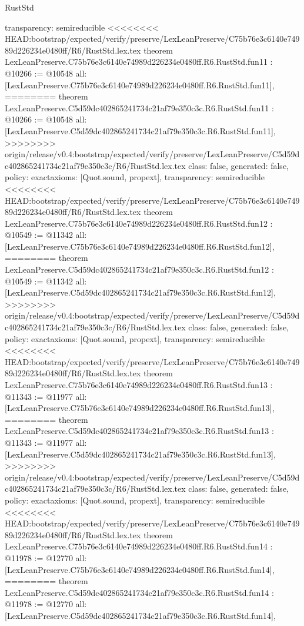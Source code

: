 \begin{lexlean}{RustStd}
\begin{coremodule}
{\begin{coremodule}
{{{{{{{{{{{{{{  transparency: semireducible
}
<<<<<<<< HEAD:bootstrap/expected/verify/preserve/LexLeanPreserve/C75b76e3c6140e74989d226234e0480ff/R6/RustStd.lex.tex
theorem LexLeanPreserve.C75b76e3c6140e74989d226234e0480ff.R6.RustStd.fun11 : @10266 := @10548 {
  all: [LexLeanPreserve.C75b76e3c6140e74989d226234e0480ff.R6.RustStd.fun11],
========
theorem LexLeanPreserve.C5d59dc402865241734c21af79e350c3c.R6.RustStd.fun11 : @10266 := @10548 {
  all: [LexLeanPreserve.C5d59dc402865241734c21af79e350c3c.R6.RustStd.fun11],
>>>>>>>> origin/release/v0.4:bootstrap/expected/verify/preserve/LexLeanPreserve/C5d59dc402865241734c21af79e350c3c/R6/RustStd.lex.tex
  class: false,
  generated: false,
  policy: exact{axioms: [Quot.sound, propext]},
  transparency: semireducible
}
<<<<<<<< HEAD:bootstrap/expected/verify/preserve/LexLeanPreserve/C75b76e3c6140e74989d226234e0480ff/R6/RustStd.lex.tex
theorem LexLeanPreserve.C75b76e3c6140e74989d226234e0480ff.R6.RustStd.fun12 : @10549 := @11342 {
  all: [LexLeanPreserve.C75b76e3c6140e74989d226234e0480ff.R6.RustStd.fun12],
========
theorem LexLeanPreserve.C5d59dc402865241734c21af79e350c3c.R6.RustStd.fun12 : @10549 := @11342 {
  all: [LexLeanPreserve.C5d59dc402865241734c21af79e350c3c.R6.RustStd.fun12],
>>>>>>>> origin/release/v0.4:bootstrap/expected/verify/preserve/LexLeanPreserve/C5d59dc402865241734c21af79e350c3c/R6/RustStd.lex.tex
  class: false,
  generated: false,
  policy: exact{axioms: [Quot.sound, propext]},
  transparency: semireducible
}
<<<<<<<< HEAD:bootstrap/expected/verify/preserve/LexLeanPreserve/C75b76e3c6140e74989d226234e0480ff/R6/RustStd.lex.tex
theorem LexLeanPreserve.C75b76e3c6140e74989d226234e0480ff.R6.RustStd.fun13 : @11343 := @11977 {
  all: [LexLeanPreserve.C75b76e3c6140e74989d226234e0480ff.R6.RustStd.fun13],
========
theorem LexLeanPreserve.C5d59dc402865241734c21af79e350c3c.R6.RustStd.fun13 : @11343 := @11977 {
  all: [LexLeanPreserve.C5d59dc402865241734c21af79e350c3c.R6.RustStd.fun13],
>>>>>>>> origin/release/v0.4:bootstrap/expected/verify/preserve/LexLeanPreserve/C5d59dc402865241734c21af79e350c3c/R6/RustStd.lex.tex
  class: false,
  generated: false,
  policy: exact{axioms: [Quot.sound, propext]},
  transparency: semireducible
}
<<<<<<<< HEAD:bootstrap/expected/verify/preserve/LexLeanPreserve/C75b76e3c6140e74989d226234e0480ff/R6/RustStd.lex.tex
theorem LexLeanPreserve.C75b76e3c6140e74989d226234e0480ff.R6.RustStd.fun14 : @11978 := @12770 {
  all: [LexLeanPreserve.C75b76e3c6140e74989d226234e0480ff.R6.RustStd.fun14],
========
theorem LexLeanPreserve.C5d59dc402865241734c21af79e350c3c.R6.RustStd.fun14 : @11978 := @12770 {
  all: [LexLeanPreserve.C5d59dc402865241734c21af79e350c3c.R6.RustStd.fun14],
}}}}}}}}}}}}}}}}}}
\end{coremodule}}
\end{coremodule}
\end{lexlean}

